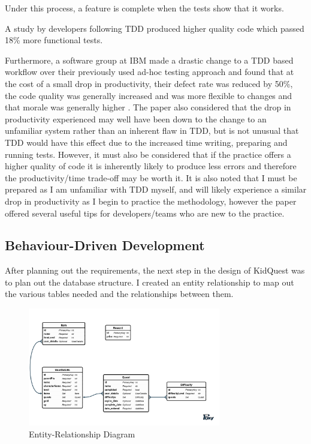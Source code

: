 Under this process, a feature is complete when the tests show that it works.

A study by \cite{George:2003:IIT:952532.952753} developers following TDD produced higher quality code which passed 18\% more functional tests.

Furthermore, a software group at IBM made a drastic change to a TDD based workflow over their previously used ad-hoc testing approach and found that at the cost of a small drop in productivity, their defect rate was reduced by 50\%, the code quality was generally increased and was more flexible to changes and that morale was generally higher \citep{IBMTDD}. 
The paper also considered that the drop in productivity experienced may well have been down to the change to an unfamiliar system rather than an inherent flaw in TDD, but is not unusual that TDD would have this effect due to the increased time writing, preparing and running tests.
However, it must also be considered that if the practice offers a higher quality of code it is inherently likely to produce less errors and therefore the productivity/time trade-off may be worth it.
It is also noted that I must be prepared as I am unfamiliar with TDD myself, and will likely experience a similar drop in productivity as I begin to practice the methodology, however the paper offered several useful tips for developers/teams who are new to the practice.

\subsection{Behaviour-Driven Development}



After planning out the requirements, the next step in the design of KidQuest was to plan out the database structure.
I created an entity relationship to map out the various tables needed and the relationships between them.

\begin{figure}[t]
	\centering
	\includegraphics[width=0.75\textwidth]{images/entityRelationshipDiagram.png}
	\caption{Entity-Relationship Diagram}
	\label{fig:ERD}
\end{figure}


